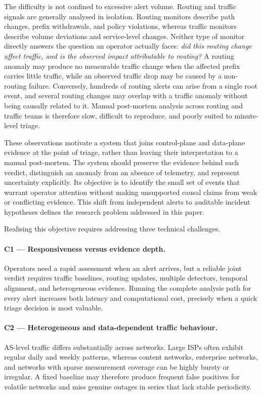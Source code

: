 The difficulty is not confined to excessive alert volume. Routing and
traffic signals are generally analysed in isolation. Routing monitors
describe path changes, prefix withdrawals, and policy violations,
whereas traffic monitors describe volume deviations and service-level
changes. Neither type of monitor directly answers the question an
operator actually faces: \emph{did this routing change affect traffic,
and is the observed impact attributable to routing?} A routing
anomaly may produce no measurable traffic change when the affected
prefix carries little traffic, while an observed traffic drop may be
caused by a non-routing failure. Conversely, hundreds of routing
alerts can arise from a single root event, and several routing changes
may overlap with a traffic anomaly without being causally related to
it. Manual post-mortem analysis across routing and traffic teams is
therefore slow, difficult to reproduce, and poorly suited to
minute-level triage.

These observations motivate a system that joins control-plane and
data-plane evidence at the point of triage, rather than leaving their
interpretation to a manual post-mortem. The system should preserve the
evidence behind each verdict, distinguish an anomaly from an absence
of telemetry, and represent uncertainty explicitly. Its objective is
to identify the small set of events that warrant operator attention
without making unsupported causal claims from weak or conflicting
evidence. This shift from independent alerts to auditable incident
hypotheses defines the research problem addressed in this paper.

Realising this objective requires addressing three technical
challenges.

\paragraph{C1 --- Responsiveness versus evidence depth.}
Operators need a rapid assessment when an alert arrives, but a
reliable joint verdict requires traffic baselines, routing updates,
multiple detectors, temporal alignment, and heterogeneous evidence.
Running the complete analysis path for every alert increases both
latency and computational cost, precisely when a quick triage
decision is most valuable.

\paragraph{C2 --- Heterogeneous and data-dependent traffic behaviour.}
AS-level traffic differs substantially across networks. Large ISPs
often exhibit regular daily and weekly patterns, whereas content
networks, enterprise networks, and networks with sparse measurement
coverage can be highly bursty or irregular. A fixed baseline may
therefore produce frequent false positives for volatile networks and
miss genuine outages in series that lack stable periodicity.

